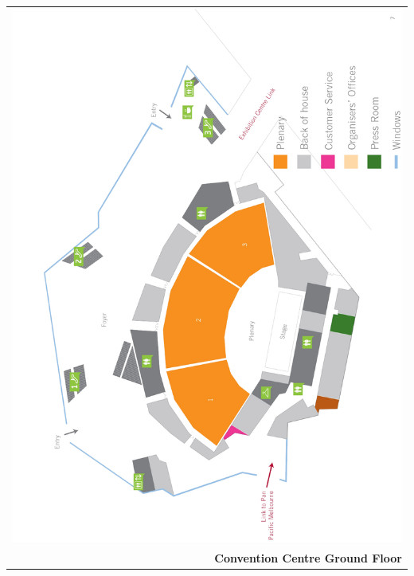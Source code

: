 \begin{center}
  \begin{tabular}{r}
    \includegraphics[width=\textwidth]{content/maps/mcec_floor1.pdf} \\
    \textbf{Convention Centre Ground Floor} %
  \end{tabular}
\end{center}

